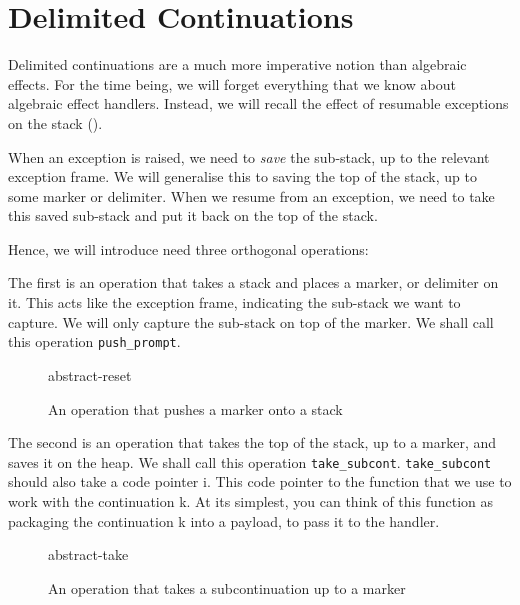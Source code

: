 
\section{Delimited Continuations}
Delimited continuations are a much more imperative notion than algebraic effects. For the time being, we will forget everything that we know about algebraic effect handlers. Instead, we will recall the effect of resumable exceptions on the stack ().

When an exception is raised, we need to \textit{save} the sub-stack, up to the relevant exception frame. We will generalise this to saving the top of the stack, up to some marker or delimiter. When we resume from an exception, we need to take this saved sub-stack and put it back on the top of the stack. 

Hence, we will introduce need three orthogonal operations:

The first is an operation that takes a stack and places a marker, or delimiter on it. This acts like the exception frame, indicating the sub-stack we want to capture. We will only capture the sub-stack on top of the marker. We shall call this operation \texttt{push\_prompt}. 

\begin{figure}[H]
    \centering
    {abstract-reset}
    \caption{An operation that pushes a marker onto a stack}
    \label{fig:abstract-pushmarker}
\end{figure}

The second is an operation that takes the top of the stack, up to a marker, and saves it on the heap. We shall call this operation \texttt{take\_subcont}. \texttt{take\_subcont} should also take a code pointer i. This code pointer to the function that we use to work with the continuation k. At its simplest, you can think of this function as packaging the continuation k into a payload, to pass it to the handler. 

\begin{figure}[H]
    \centering
    {abstract-take}
    \caption{An operation that takes a subcontinuation up to a marker}
    \label{fig:abstract-takesubcont}
\end{figure}

